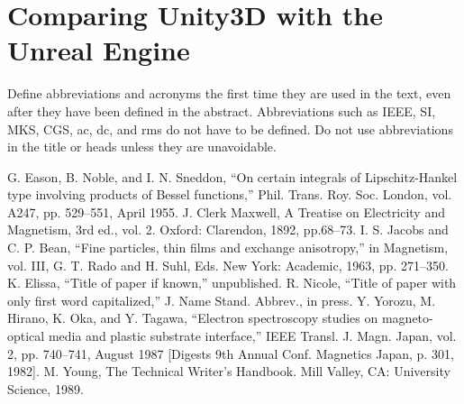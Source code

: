 \documentclass[conference]{IEEEtran}
\begin{document}
\section{Comparing Unity3D with the Unreal Engine}
Define abbreviations and acronyms the first time they are used in the text, 
even after they have been defined in the abstract. Abbreviations such as 
IEEE, SI, MKS, CGS, ac, dc, and rms do not have to be defined. Do not use 
abbreviations in the title or heads unless they are unavoidable.


\begin{thebibliography}{00}
 G. Eason, B. Noble, and I. N. Sneddon, ``On certain integrals of Lipschitz-Hankel type involving products of Bessel functions,'' Phil. Trans. Roy. Soc. London, vol. A247, pp. 529--551, April 1955.
 J. Clerk Maxwell, A Treatise on Electricity and Magnetism, 3rd ed., vol. 2. Oxford: Clarendon, 1892, pp.68--73.
 I. S. Jacobs and C. P. Bean, ``Fine particles, thin films and exchange anisotropy,'' in Magnetism, vol. III, G. T. Rado and H. Suhl, Eds. New York: Academic, 1963, pp. 271--350.
 K. Elissa, ``Title of paper if known,'' unpublished.
 R. Nicole, ``Title of paper with only first word capitalized,'' J. Name Stand. Abbrev., in press.
 Y. Yorozu, M. Hirano, K. Oka, and Y. Tagawa, ``Electron spectroscopy studies on magneto-optical media and plastic substrate interface,'' IEEE Transl. J. Magn. Japan, vol. 2, pp. 740--741, August 1987 [Digests 9th Annual Conf. Magnetics Japan, p. 301, 1982].
 M. Young, The Technical Writer's Handbook. Mill Valley, CA: University Science, 1989.
\end{thebibliography}
\end{document}

